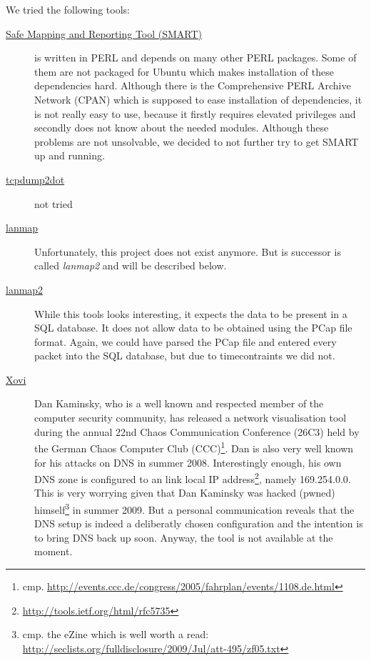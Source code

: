 \documentclass[a4paper,
    11pt,
    normalheadings,
    parindent,
    UKenglish,
    abstracton,
    ]{scrartcl}
\begin{document}
We tried the following tools:
\begin{description}
    \item[\href{http://sourceforge.net/projects/safemap/}{Safe Mapping and Reporting Tool (SMART)}]
        is written in PERL and depends on many other PERL packages.
        Some of them are not packaged for Ubuntu which makes installation of these dependencies hard.
        Although there is the Comprehensive PERL Archive Network (CPAN) which is supposed to ease installation of dependencies, it is not really easy to use, because it firstly requires elevated privileges and secondly does not know about the needed modules.
        Although these problems are not unsolvable, we decided to not further try to get SMART up and running.

    \item[\href{http://www.grotto-group.com/~gulfie/projects/analysis/tcpdump2dot/gallery/}{tcpdump2dot}] not tried
    \item[\href{http://www.parseerror.com/pizza/lanmap/}{lanmap}]
        Unfortunately, this project does not exist anymore.
        But is successor is called \emph{lanmap2} and will be described below.

    \item[\href{http://github.com/pizza/lanmap2}{lanmap2}]
        While this tools looks interesting, it expects the data to be present in a SQL database.
        It does not allow data to be obtained using the PCap file format.
        Again, we could have parsed the PCap file and entered every packet into the SQL database, but due to timecontraints we did not.

    \item[\href{http://www.doxpara.com}{Xovi}]
        Dan Kaminsky, who is a well known and respected member of the computer security community, has released a network visualisation tool during the annual 22nd Chaos Communication Conference (26C3) held by the German Chaos Computer Club (CCC)\footnote{cmp. \url{http://events.ccc.de/congress/2005/fahrplan/events/1108.de.html}}.
        Dan is also very well known for his attacks on DNS in summer 2008.
        Interestingly enough, his own DNS zone is configured to an link local IP address\footnote{\url{http://tools.ietf.org/html/rfc5735}}, namely 169.254.0.0.
        This is very worrying given that Dan Kaminsky was hacked (pwned) himself\footnote{cmp. the eZine which is well worth a read: \url{http://seclists.org/fulldisclosure/2009/Jul/att-495/zf05.txt}} in summer 2009.
        But a personal communication reveals that the DNS setup is indeed a deliberatly chosen configuration and the intention is to bring DNS back up soon.
        Anyway, the tool is not available at the moment.


\end{description}
\end{document}
